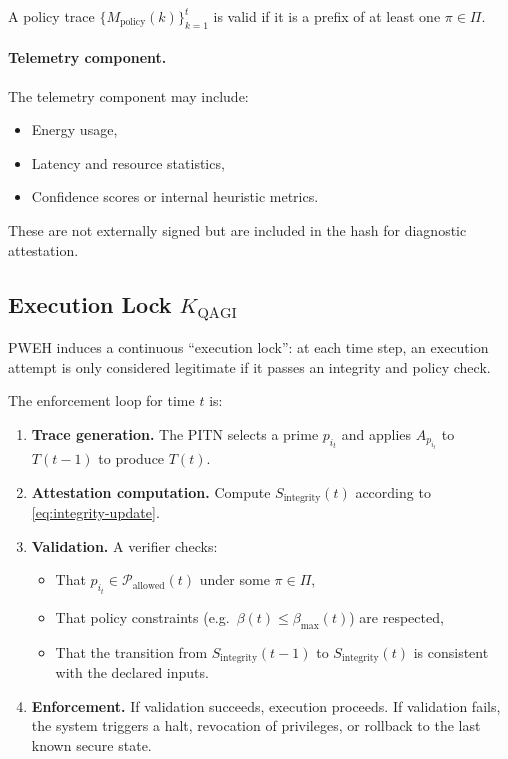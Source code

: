 \documentclass[11pt]{article}
\begin{document}
A policy trace \(\{M_{\text{policy}}(k)\}_{k=1}^t\) is valid if it is a prefix of at least one \(\pi \in \Pi\).

\paragraph{Telemetry component.}
The telemetry component may include:
\begin{itemize}[leftmargin=1.5em]
  \item Energy usage,
  \item Latency and resource statistics,
  \item Confidence scores or internal heuristic metrics.
\end{itemize}
These are not externally signed but are included in the hash for diagnostic attestation.

\subsection{Execution Lock \(K_{\text{QAGI}}\)}

PWEH induces a continuous ``execution lock'':
at each time step, an execution attempt is only considered legitimate if it passes an integrity and policy check.

The enforcement loop for time \(t\) is:

\begin{enumerate}[leftmargin=1.5em]
  \item \textbf{Trace generation.}
  The PITN selects a prime \(p_{i_t}\) and applies \(A_{p_{i_t}}\) to \(T(t-1)\) to produce \(T(t)\).

  \item \textbf{Attestation computation.}
  Compute \(S_{\text{integrity}}(t)\) according to \eqref{eq:integrity-update}.

  \item \textbf{Validation.}
  A verifier checks:
  \begin{itemize}
    \item That \(p_{i_t} \in \mathcal{P}_{\text{allowed}}(t)\) under some \(\pi \in \Pi\),
    \item That policy constraints (e.g.\ \(\beta(t) \le \beta_{\max}(t)\)) are respected,
    \item That the transition from \(S_{\text{integrity}}(t-1)\) to \(S_{\text{integrity}}(t)\) is consistent with the declared inputs.
  \end{itemize}

  \item \textbf{Enforcement.}
  If validation succeeds, execution proceeds.
  If validation fails, the system triggers a halt, revocation of privileges, or rollback to the last known secure state.
\end{enumerate}
\end{document}
